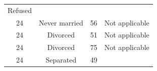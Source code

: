 \documentclass[]{tufte-book}
\begin{document}
\begin{longtable}[]{@{}cccc@{}}
\begin{minipage}[t]{0.21\columnwidth}
Refused\strut
\end{minipage}\tabularnewline
\begin{minipage}[t]{0.14\columnwidth}\centering\strut
24\strut
\end{minipage} & \begin{minipage}[t]{0.20\columnwidth}\centering\strut
Never married\strut
\end{minipage} & \begin{minipage}[t]{0.07\columnwidth}\centering\strut
56\strut
\end{minipage} & \begin{minipage}[t]{0.21\columnwidth}\centering\strut
Not applicable\strut
\end{minipage}\tabularnewline
\begin{minipage}[t]{0.14\columnwidth}\centering\strut
24\strut
\end{minipage} & \begin{minipage}[t]{0.20\columnwidth}\centering\strut
Divorced\strut
\end{minipage} & \begin{minipage}[t]{0.07\columnwidth}\centering\strut
51\strut
\end{minipage} & \begin{minipage}[t]{0.21\columnwidth}\centering\strut
Not applicable\strut
\end{minipage}\tabularnewline
\begin{minipage}[t]{0.14\columnwidth}\centering\strut
24\strut
\end{minipage} & \begin{minipage}[t]{0.20\columnwidth}\centering\strut
Divorced\strut
\end{minipage} & \begin{minipage}[t]{0.07\columnwidth}\centering\strut
75\strut
\end{minipage} & \begin{minipage}[t]{0.21\columnwidth}\centering\strut
Not applicable\strut
\end{minipage}\tabularnewline
\begin{minipage}[t]{0.14\columnwidth}\centering\strut
24\strut
\end{minipage} & \begin{minipage}[t]{0.20\columnwidth}\centering\strut
Separated\strut
\end{minipage} & \begin{minipage}[t]{0.07\columnwidth}\centering\strut
49\strut
\end{minipage} & \begin{minipage}[t]{0.21\columnwidth}\centering\strut

\end{minipage}
\end{longtable}
\end{document}
